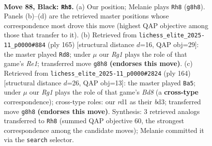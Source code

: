 \documentclass[11pt]{article}
\begin{document}
\begin{figure}[p]\centering
\begin{subfigure}{0.46\textwidth}\centering
\resizebox{\linewidth}{!}{%
\newchessgame
\chessboard[
  setfen={6r1/8/p3k3/Ppp2p1p/2p2P1P/4P1P1/1P3K2/3R4 b - - 22 88},
  showmover=false,
  pgfstyle=straightmove, color=movearrow, markmove={g8-h8}
]}
\caption{}
\end{subfigure}\hfill
\begin{subfigure}{0.46\textwidth}\centering
\resizebox{\linewidth}{!}{%
\newchessgame
\chessboard[
  setfen={4r3/1p6/p1p2kp1/P6p/1P3P1P/4PK2/2R5/8 b - - 2 83},
  showmover=false,
  pgfstyle=straightmove, color=movearrow, markmove={e8-d8}
]}
\caption{}
\end{subfigure}
\\[4pt]
\begin{subfigure}{0.46\textwidth}\centering
\resizebox{\linewidth}{!}{%
\newchessgame
\chessboard[
  setfen={3B2k1/6p1/p4p1p/1p1p3P/3P2P1/P1Pb1P2/6K1/8 w - - 45 83},
  showmover=false,
  pgfstyle=straightmove, color=movearrow, markmove={d8-a5}
]}
\caption{}
\end{subfigure}\hfill

\caption{\textbf{Move 88, Black: \texttt{Rh8}.} (a) Our position; Melanie plays \texttt{Rh8} (\texttt{g8h8}). Panels (b)--(d) are the retrieved master positions whose correspondence most drove this move (highest QAP objective among those that transfer to it). (b) Retrieved from \texttt{lichess\_elite\_2025-11\_p0000\#884} (ply 165) [structural distance $d$=16, QAP obj=29]: the master played \texttt{Rd8}; under $\mu$ our \emph{Rg1} plays the role of that game's \emph{Re1}; transferred move \texttt{g8h8} \textbf{(endorses this move)}. (c) Retrieved from \texttt{lichess\_elite\_2025-11\_p0000\#2824} (ply 164) [structural distance $d$=26, QAP obj=13]: the master played \texttt{Ba5}; under $\mu$ our \emph{Rg1} plays the role of that game's \emph{Bd8} (a \textbf{cross-type} correspondence); cross-type roles: our \emph{r}d1 as their \emph{b}d3; transferred move \texttt{g8h8} \textbf{(endorses this move)}. Synthesis: 3 retrieved analogs transferred to \texttt{Rh8} (summed QAP objective 60, the strongest correspondence among the candidate moves); Melanie committed it via the \texttt{search} selector.}
\label{fig:thought-m175}
\end{figure}

\clearpage
\end{document}
